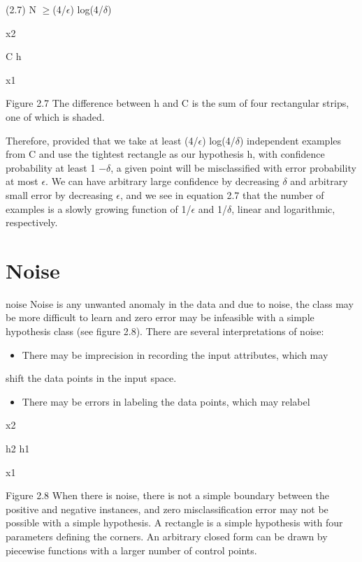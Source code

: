 (2.7) N $\geq$(4/$\epsilon$) log(4/$\delta$)

x2

C h

x1

Figure 2.7 The difference between h and C is the sum of four rectangular strips, one of which is shaded.

Therefore, provided that we take at least (4/$\epsilon$) log(4/$\delta$) independent examples from C and use the tightest rectangle as our hypothesis h, with confidence probability at least 1 $-$$\delta$, a given point will be misclassified with error probability at most $\epsilon$. We can have arbitrary large confidence by decreasing $\delta$ and arbitrary small error by decreasing $\epsilon$, and we see in equation 2.7 that the number of examples is a slowly growing function of 1/$\epsilon$ and 1/$\delta$, linear and logarithmic, respectively.

\section{Noise}

noise Noise is any unwanted anomaly in the data and due to noise, the class may be more difficult to learn and zero error may be infeasible with a simple hypothesis class (see figure 2.8). There are several interpretations of noise:

\begin{itemize}
\item There may be imprecision in recording the input attributes, which may
\end{itemize}

shift the data points in the input space.

\begin{itemize}
\item There may be errors in labeling the data points, which may relabel
\end{itemize}

x2

h2 h1

x1

Figure 2.8 When there is noise, there is not a simple boundary between the positive and negative instances, and zero misclassification error may not be possible with a simple hypothesis. A rectangle is a simple hypothesis with four parameters defining the corners. An arbitrary closed form can be drawn by piecewise functions with a larger number of control points.

